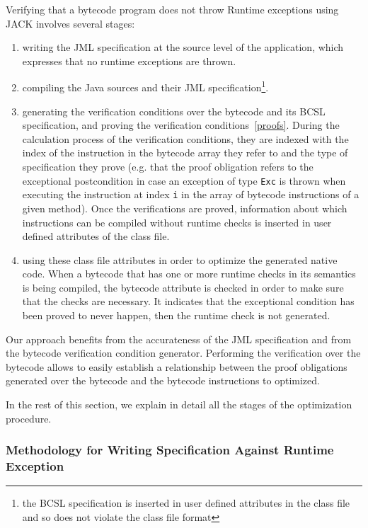Verifying that a bytecode program does not throw Runtime exceptions using JACK involves several stages:
\begin{enumerate}
\item writing the JML specification at the source level of the application, which expresses that no runtime exceptions are thrown.
\item compiling the Java sources and their JML specification\footnote{the BCSL specification is inserted in user defined attributes in the class file and so does not violate the class file format}.
\item generating the verification conditions over the bytecode and its BCSL specification, and proving the verification conditions~\ref{proofs}. During the calculation process of the verification conditions, they are indexed with the index of the instruction in the bytecode array they refer to and the type of specification they prove (e.g. that the proof obligation refers to the exceptional postcondition in case an exception of type \texttt{Exc} is thrown when executing the instruction at index \texttt{i} in the array of bytecode instructions of a given method). Once the verifications are proved, information about which instructions can be compiled without runtime checks is inserted in user defined attributes of the class file.
\item using these class file attributes in order to optimize the generated native code. When a bytecode that has one or more runtime checks in its semantics is being compiled, the bytecode attribute is checked in order to make sure that the checks are necessary. It indicates that the exceptional condition has been proved to never happen, then the runtime check is not generated.
\end{enumerate}

Our approach benefits from the accurateness of the JML specification and from the bytecode verification condition generator. Performing the verification over the bytecode allows to easily establish a relationship between the proof obligations generated over the bytecode and the bytecode instructions to optimized.

In the rest of this section, we explain in detail all the stages of the optimization procedure.

\subsubsection{Methodology for Writing Specification Against Runtime Exception}

